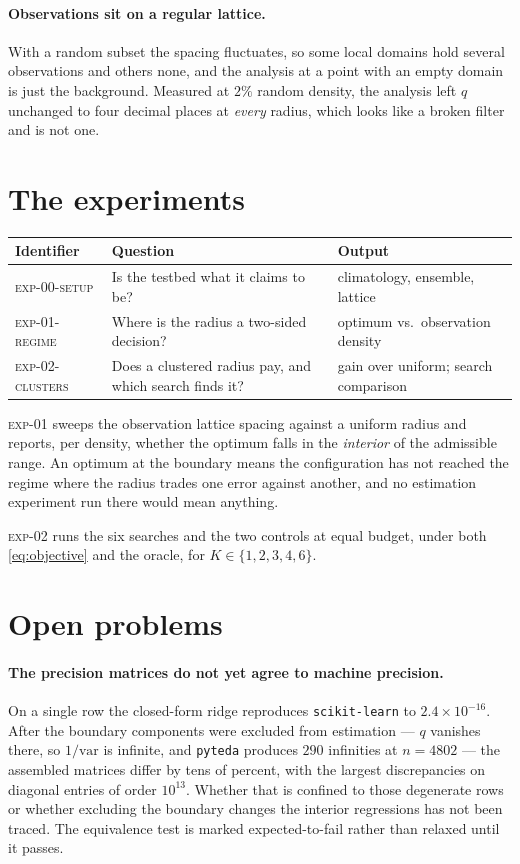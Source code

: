 \documentclass[11pt,a4paper]{article}
\theoremstyle{definition}
\begin{document}
\paragraph{Observations sit on a regular lattice.}
With a random subset the spacing fluctuates, so some local domains hold several
observations and others none, and the analysis at a point with an empty domain
is just the background. Measured at $2\%$ random density, the analysis left $q$
unchanged to four decimal places at \emph{every} radius, which looks like a
broken filter and is not one.

\section{The experiments}

\begin{table}[h]
\centering
\begin{tabular}{@{}lll@{}}
\toprule
Identifier & Question & Output \\
\midrule
\textsc{exp-00-setup} & Is the testbed what it claims to be?
  & climatology, ensemble, lattice \\
\textsc{exp-01-regime} & Where is the radius a two-sided decision?
  & optimum vs.\ observation density \\
\textsc{exp-02-clusters} & Does a clustered radius pay, and which search finds it?
  & gain over uniform; search comparison \\
\bottomrule
\end{tabular}
\end{table}

\noindent
\textsc{exp-01} sweeps the observation lattice spacing against a uniform radius
and reports, per density, whether the optimum falls in the \emph{interior} of
the admissible range. An optimum at the boundary means the configuration has
not reached the regime where the radius trades one error against another, and
no estimation experiment run there would mean anything.

\textsc{exp-02} runs the six searches and the two controls at equal budget,
under both \eqref{eq:objective} and the oracle, for $K \in \{1,2,3,4,6\}$.

\section{Open problems}

\paragraph{The precision matrices do not yet agree to machine precision.}
On a single row the closed-form ridge reproduces \texttt{scikit-learn} to
$2.4 \times 10^{-16}$. After the boundary components were excluded from
estimation --- $q$ vanishes there, so $1/\mathrm{var}$ is infinite, and
\texttt{pyteda} produces $290$ infinities at $n = 4802$ --- the assembled
matrices differ by tens of percent, with the largest discrepancies on diagonal
entries of order $10^{13}$. Whether that is confined to those degenerate rows or
whether excluding the boundary changes the interior regressions has not been
traced. The equivalence test is marked expected-to-fail rather than relaxed
until it passes.
\end{document}
